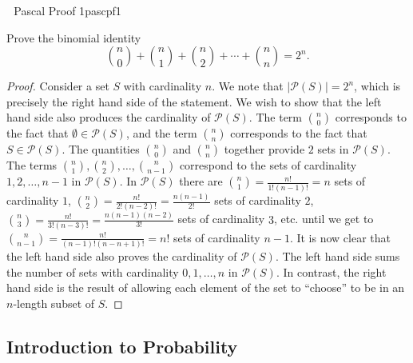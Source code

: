         \begin{example}{\Difficulty\,\Difficulty\,\Difficulty\,\,Pascal Proof 1}{pascpf1}
        
            Prove the binomial identity
            \begin{equation*}
                \binom{n}{0}+\binom{n}{1}+\binom{n}{2}+\cdots+\binom{n}{n}=2^n.
            \end{equation*}
            \begin{proof}
                Consider a set \(S\) with cardinality \(n\). We note that \(|\mathcal{P}(S)|=2^n\), which is precisely the right hand side of the statement. We wish to show that the left hand side also produces the cardinality of \(\mathcal{P}(S)\). The term \(\binom{n}{0}\) corresponds to the fact that \(\emptyset\in\mathcal{P}(S)\), and the term \(\binom{n}{n}\) corresponds to the fact that \(S\in\mathcal{P}(S)\). The quantities \(\binom{n}{0}\) and \(\binom{n}{n}\) together provide \(2\) sets in \(\mathcal{P}(S)\). The terms \(\binom{n}{1},\binom{n}{2},\ldots,\binom{n}{n-1}\) correspond to the sets of cardinality \(1,2,\ldots,n-1\) in \(\mathcal{P}(S)\). In \(\mathcal{P}(S)\) there are \(\binom{n}{1}=\frac{n!}{1!(n-1)!}=n\) sets of cardinality \(1\), \(\binom{n}{2}=\frac{n!}{2!(n-2)!}=\frac{n(n-1)}{2!}\) sets of cardinality \(2\), \(\binom{n}{3}=\frac{n!}{3!(n-3)!}=\frac{n(n-1)(n-2)}{3!}\) sets of cardinality \(3\), etc. until we get to \(\binom{n}{n-1}=\frac{n!}{(n-1)!(n-n+1)!}=n!\) sets of cardinality \(n-1\). It is now clear that the left hand side also proves the cardinality of \(\mathcal{P}(S)\). The left hand side sums the number of sets with cardinality \(0,1,\ldots,n\) in \(\mathcal{P}(S)\). In contrast, the right hand side is the result of allowing each element of the set to ``choose'' to be in an \(n\)-length subset of \(S\).
            \end{proof}
        
        \end{example}

    \pagebreak
    
    \subsection{Introduction to Probability}
    
